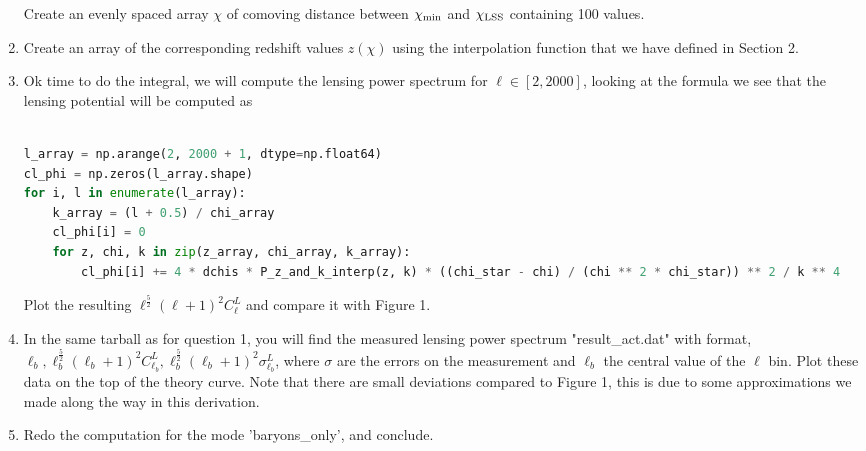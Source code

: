 \documentclass[a4paper, 11pt]{article}
\def\ba{\begin{eqnarray}}
\def\ea{\end{eqnarray}}
\begin{document}
\begin{enumerate}
Create an evenly spaced array $\chi$ of comoving distance between $\chi_{\rm min}$ and $\chi_{\rm LSS}$ containing 100 values.
\item Create an array of the corresponding redshift values $z(\chi)$ using the interpolation function that we have defined in Section 2.
\item Ok time to do the integral, we will compute the lensing power spectrum for $\ell \in [2, 2000]$, looking at the formula we see that the lensing potential will be computed as  \\ \\

 \begin{lstlisting}[language=Python]
l_array = np.arange(2, 2000 + 1, dtype=np.float64)
cl_phi = np.zeros(l_array.shape)
for i, l in enumerate(l_array):
    k_array = (l + 0.5) / chi_array
    cl_phi[i] = 0
    for z, chi, k in zip(z_array, chi_array, k_array):
        cl_phi[i] += 4 * dchis * P_z_and_k_interp(z, k) * ((chi_star - chi) / (chi ** 2 * chi_star)) ** 2 / k ** 4
\end{lstlisting}

Plot the resulting $\ell^\frac{5}{2}(\ell+1)^{2} C_{\ell}^{L}$ and compare it with Figure 1.

\item In the same tarball as for question 1, you will find the measured lensing power spectrum "result\_act.dat" with format, $\ell_{b}, \ell_{b}^\frac{5}{2}(\ell_{b}+1)^{2} C_{\ell_{b}}^{L}, \ell_{b}^\frac{5}{2}(\ell_{b}+1)^{2} \sigma_{\ell_{b}}^{L}$, where $\sigma$ are the errors on the measurement and $\ell_{b}$ the central value of the $\ell$ bin. Plot these data on the top of the theory curve. Note that there are small deviations compared to Figure 1, this is due to some approximations we made along the way in this derivation.
\item Redo the computation for the mode  'baryons\_only', and conclude.





\end{enumerate}

\end{document}
